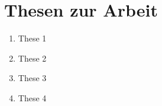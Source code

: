 \chapter*{Thesen zur Arbeit}
\label{ch:Thesen}
\thispagestyle{empty}

\begin{enumerate}
    \item These 1
    \item These 2
    \item These 3
    \item These 4
\end{enumerate}